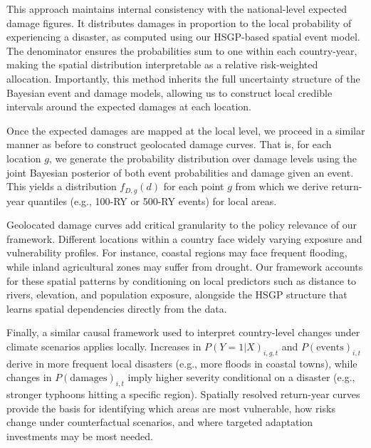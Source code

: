This approach maintains internal consistency with the national-level expected damage figures. It distributes damages in proportion to the local probability of experiencing a disaster, as computed using our HSGP-based spatial event model. The denominator ensures the probabilities sum to one within each country-year, making the spatial distribution interpretable as a relative risk-weighted allocation. Importantly, this method inherits the full uncertainty structure of the Bayesian event and damage models, allowing us to construct local credible intervals around the expected damages at each location.

Once the expected damages are mapped at the local level, we proceed in a similar manner as before to construct geolocated damage curves. That is, for each location $g$, we generate the probability distribution over damage levels using the joint Bayesian posterior of both event probabilities and damage given an event. This yields a distribution $f_{D,g}(d)$ for each point $g$ from which we derive return-year quantiles (e.g., 100-RY or 500-RY events) for local areas.

Geolocated damage curves add critical granularity to the policy relevance of our framework. Different locations within a country face widely varying exposure and vulnerability profiles. For instance, coastal regions may face frequent flooding, while inland agricultural zones may suffer from drought. Our framework accounts for these spatial patterns by conditioning on local predictors such as distance to rivers, elevation, and population exposure, alongside the HSGP structure that learns spatial dependencies directly from the data.

Finally, a similar causal framework used to interpret country-level changes under climate scenarios applies locally. Increases in $P(Y=1|X)_{i,g,t}$ and $P(\text{events})_{i,t}$ derive in more frequent local disasters (e.g., more floods in coastal towns), while changes in $P(\text{damages})_{i,t}$ imply higher severity conditional on a disaster (e.g., stronger typhoons hitting a specific region). Spatially resolved return-year curves provide the basis for identifying which areas are most vulnerable, how risks change under counterfactual scenarios, and where targeted adaptation investments may be most needed.

\newpage
